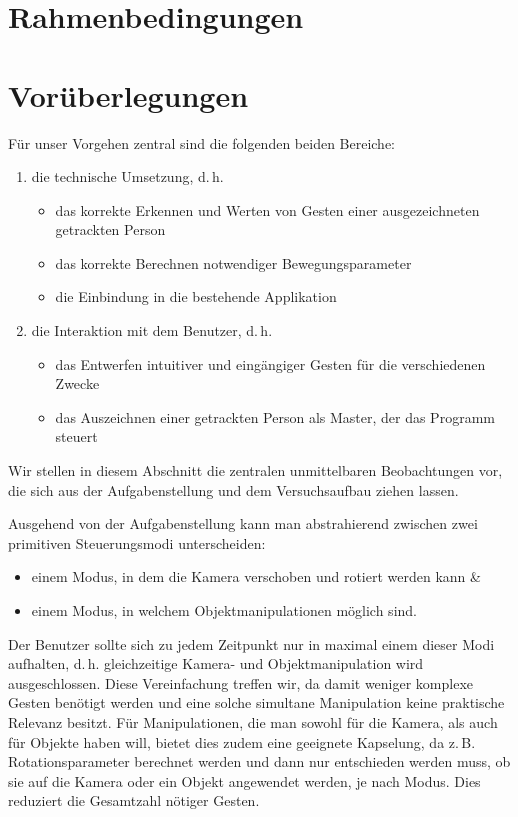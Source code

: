 \documentclass[12pt,a4paper]{article}
\title{\Title}
\author{
	Mario Janke\\
	Peter Lindner\\
	Patrick Stäblein}
\date{}
\begin{document}
\maketitle
\tableofcontents
\clearpage
\section{Rahmenbedingungen}
	
	
\clearpage
\section{Vorüberlegungen}
	Für unser Vorgehen zentral sind die folgenden beiden Bereiche:
	\begin{enumerate}
		\item die technische Umsetzung, d.\,h.
		\begin{itemize}
		\item das korrekte Erkennen und Werten von Gesten einer ausgezeichneten getrackten Person
		\item das korrekte Berechnen notwendiger Bewegungsparameter
		\item die Einbindung in die bestehende Applikation
		\end{itemize}
		\item die Interaktion mit dem Benutzer, d.\,h.
		\begin{itemize}
		\item das Entwerfen intuitiver und eingängiger Gesten für die verschiedenen Zwecke
		\item das Auszeichnen einer getrackten Person als \glqq Master\grqq, der das Programm steuert
		\end{itemize}
	\end{enumerate}
	Wir stellen in diesem Abschnitt die zentralen unmittelbaren Beobachtungen vor, die sich aus der Aufgabenstellung und dem Versuchsaufbau ziehen lassen.\par\bigskip
	Ausgehend von der Aufgabenstellung kann man abstrahierend zwischen zwei primitiven Steuerungsmodi unterscheiden:
	\begin{itemize}
	\item einem Modus, in dem die Kamera verschoben und rotiert werden kann \&
	\item einem Modus, in welchem Objektmanipulationen möglich sind.
	\end{itemize}
	Der Benutzer sollte sich zu jedem Zeitpunkt nur in maximal einem dieser Modi aufhalten, d.\,h. gleichzeitige Kamera- und Objektmanipulation wird ausgeschlossen. Diese Vereinfachung treffen wir, da damit weniger komplexe Gesten benötigt werden und eine solche simultane Manipulation keine praktische Relevanz besitzt. Für Manipulationen, die man sowohl für die Kamera, als auch für Objekte haben will, bietet dies zudem eine geeignete Kapselung, da z.\,B. Rotationsparameter berechnet werden und dann nur entschieden werden muss, ob sie auf die Kamera oder ein Objekt angewendet werden, je nach Modus. Dies reduziert die Gesamtzahl nötiger Gesten.\par\medskip
\end{document}
